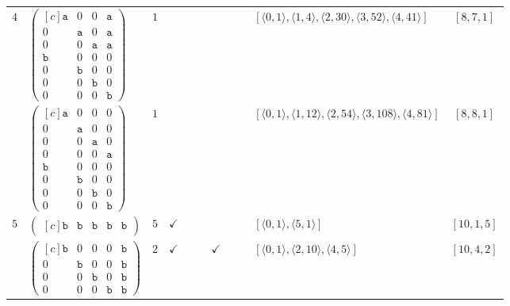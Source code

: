 \documentclass[12pt]{article}
\theoremstyle{definition}
\theoremstyle{plain}
\begin{document}
{\begin{longtable}{@{}cYcccccccZc@{}}

$4$
& $\begin{pmatrix*}[c]
\mathtt{a}  &  0  &  0  &  \mathtt{a}    \\
0  &  \mathtt{a}  &  0  &  \mathtt{a}  \\
0  &  0  &  \mathtt{a}  &  \mathtt{a}  \\
\mathtt{b}  &  0  &  0  &  0  \\
0  &  \mathtt{b}  &  0  &  0  \\
0  &  0  &  \mathtt{b}  &  0  \\
0  &  0  &  0  &  \mathtt{b}
\end{pmatrix*}$
& $1$
&
&
&
&
&
&
& $[\langle0,1\rangle,\allowbreak\langle1,4\rangle,\allowbreak\langle2,30\rangle,\allowbreak\langle3,52\rangle,\allowbreak\langle4,41\rangle]$
& $[8,7,1]$     \\

\cmidrule(lr){2-11}

& $\begin{pmatrix*}[c]
\mathtt{a}  &  0  &  0  &  0  \\
0  &  \mathtt{a}  &  0  &  0  \\
0  &  0  &  \mathtt{a}  &  0  \\
0  &  0  &  0  &  \mathtt{a}  \\
\mathtt{b}  &  0  &  0  &  0  \\
0  &  \mathtt{b}  &  0  &  0  \\
0  &  0  &  \mathtt{b}  &  0  \\
0  &  0  &  0  &  \mathtt{b}
\end{pmatrix*}$
& $1$
&
&
&
&
&
&
& $[\langle0,1\rangle,\allowbreak\langle1,12\rangle,\allowbreak\langle2,54\rangle,\allowbreak\langle3,108\rangle,\allowbreak\langle4,81\rangle]$
& $[8,8,1]$     \\

\midrule[\heavyrulewidth]

$5$
& $\begin{pmatrix*}[c]
\mathtt{b}   &  \mathtt{b}    &  \mathtt{b}    &   \mathtt{b}  &  \mathtt{b}
\end{pmatrix*}$
& $5$
& $\checkmark$
&
&
&
&
&
& $[\langle0,1\rangle,\allowbreak\langle5,1\rangle]$
& $[10,1,5]$     \\

\cmidrule(lr){2-11}

& $\begin{pmatrix*}[c]
\mathtt{b}  &  0  &  0  &  0  &  \mathtt{b}  \\
0  &  \mathtt{b}  &  0  &  0  &  \mathtt{b}  \\
0  &  0  &  \mathtt{b}  &  0  &  \mathtt{b}  \\
0  &  0  &  0  &  \mathtt{b}  &  \mathtt{b}
\end{pmatrix*}$
& $2$
& $\checkmark$
&
&
& $\checkmark$
&
&
& $[\langle0,1\rangle,\allowbreak\langle2,10\rangle,\allowbreak\langle4,5\rangle]$
& $[10,4,2]$\\


\end{longtable}}
\end{document}

